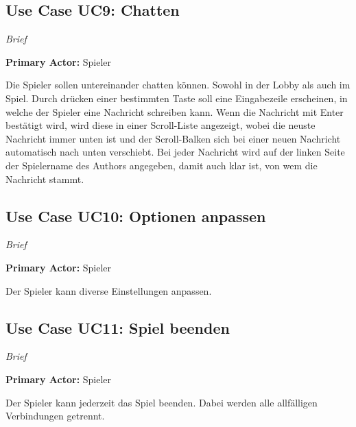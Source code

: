 \subsection{Use Case UC9: Chatten}
\textit{Brief}

\textbf{Primary Actor:} Spieler

Die Spieler sollen untereinander chatten können. Sowohl in der Lobby als auch im Spiel.
Durch drücken einer bestimmten Taste soll eine Eingabezeile erscheinen, in welche der Spieler eine 
Nachricht schreiben kann. Wenn die Nachricht mit Enter bestätigt wird, wird diese in einer Scroll-Liste
angezeigt, wobei die neuste Nachricht immer unten ist und der Scroll-Balken sich bei einer neuen Nachricht
automatisch nach unten verschiebt.
Bei jeder Nachricht wird auf der linken Seite der Spielername des Authors angegeben, damit auch klar ist,
von wem die Nachricht stammt. 



\subsection{Use Case UC10: Optionen anpassen}
\textit{Brief}

\textbf{Primary Actor:} Spieler

Der Spieler kann diverse Einstellungen anpassen.



\subsection{Use Case UC11: Spiel beenden}
\textit{Brief}

\textbf{Primary Actor:} Spieler

Der Spieler kann jederzeit das Spiel beenden. Dabei werden alle allfälligen Verbindungen getrennt.


